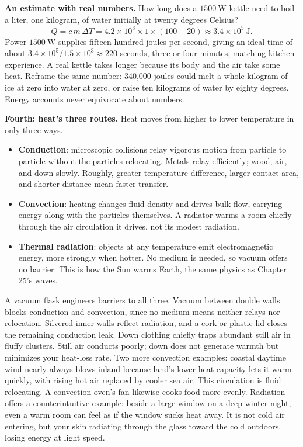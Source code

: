 \textbf{An estimate with real numbers.} How long does a \(1500\ \mathrm{W}\) kettle need to boil a liter, one kilogram, of water initially at twenty degrees Celsius?
\[
Q = c\,m\,\Delta T = 4.2\times10^{3}\times 1\times (100-20) \approx 3.4\times10^{5}\ \mathrm{J}.
\]
Power \(1500\ \mathrm{W}\) supplies fifteen hundred joules per second, giving an ideal time of about \(3.4\times10^{5}/1.5\times10^{3}\approx 220\) seconds, three or four minutes, matching kitchen experience. A real kettle takes longer because its body and the air take some heat. Reframe the same number: 340,000 joules could melt a whole kilogram of ice at zero into water at zero, or raise ten kilograms of water by eighty degrees. Energy accounts never equivocate about numbers.

\textbf{Fourth: heat's three routes.} Heat moves from higher to lower temperature in only three ways.
\begin{itemize}[leftmargin=1.8em]
\item \textbf{Conduction}: microscopic collisions relay vigorous motion from particle to particle without the particles relocating. Metals relay efficiently; wood, air, and down slowly. Roughly, greater temperature difference, larger contact area, and shorter distance mean faster transfer.
\item \textbf{Convection}: heating changes fluid density and drives bulk flow, carrying energy along with the particles themselves. A radiator warms a room chiefly through the air circulation it drives, not its modest radiation.
\item \textbf{Thermal radiation}: objects at any temperature emit electromagnetic energy, more strongly when hotter. No medium is needed, so vacuum offers no barrier. This is how the Sun warms Earth, the same physics as Chapter 25's waves.
\end{itemize}
A vacuum flask engineers barriers to all three. Vacuum between double walls blocks conduction and convection, since no medium means neither relays nor relocation. Silvered inner walls reflect radiation, and a cork or plastic lid closes the remaining conduction leak. Down clothing chiefly traps abundant still air in fluffy clusters. Still air conducts poorly; down does not generate warmth but minimizes your heat-loss rate. Two more convection examples: coastal daytime wind nearly always blows inland because land's lower heat capacity lets it warm quickly, with rising hot air replaced by cooler sea air. This circulation is fluid relocating. A convection oven's fan likewise cooks food more evenly. Radiation offers a counterintuitive example: beside a large window on a deep-winter night, even a warm room can feel as if the window sucks heat away. It is not cold air entering, but your skin radiating through the glass toward the cold outdoors, losing energy at light speed.

